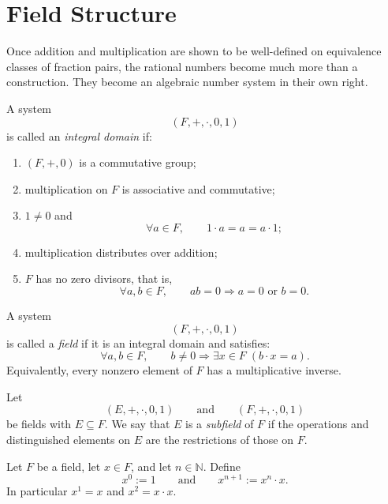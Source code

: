 
\section{Field Structure}
\label{sec:field-structure-q}

Once addition and multiplication are shown to be well-defined on
equivalence classes of fraction pairs, the rational numbers become much
more than a construction. They become an algebraic number system in
their own right.

\begin{definition}
\label{def:integral-domain}
A system
\[
(F,+,\cdot,0,1)
\]
is called an \emph{integral domain} if:
\begin{enumerate}
  \item $(F,+,0)$ is a commutative group;
  \item multiplication on $F$ is associative and commutative;
  \item $1\neq 0$ and
  \[
  \forall a\in F,\qquad 1\cdot a=a=a\cdot 1;
  \]
  \item multiplication distributes over addition;
  \item $F$ has no zero divisors, that is,
  \[
  \forall a,b\in F,\qquad ab=0 \Longrightarrow a=0 \text{ or } b=0.
  \]
\end{enumerate}
\end{definition}

\begin{definition}[Field]
\label{def:field}
A system
\[
(F,+,\cdot,0,1)
\]
is called a \emph{field} if it is an integral domain and satisfies:
\[
\forall a,b\in F,\qquad b\neq 0 \Longrightarrow \exists x\in F\;(b\cdot x=a).
\]
Equivalently, every nonzero element of $F$ has a multiplicative inverse.
\end{definition}

\begin{definition}[Subfield]
\label{def:subfield}
Let
\[
(E,+,\cdot,0,1)
\qquad\text{and}\qquad
(F,+,\cdot,0,1)
\]
be fields with $E\subseteq F$. We say that $E$ is a \emph{subfield} of $F$
if the operations and distinguished elements on $E$ are the restrictions of
those on $F$.
\end{definition}

\begin{definition}
\label{def:nonneg-integer-exponents-field}
Let $F$ be a field, let $x\in F$, and let $n\in\mathbb{N}$.  Define
\[
x^0 := 1
\qquad\text{and}\qquad
x^{n+1} := x^n\cdot x.
\]
In particular $x^1 = x$ and $x^2 = x\cdot x$.
\end{definition}

